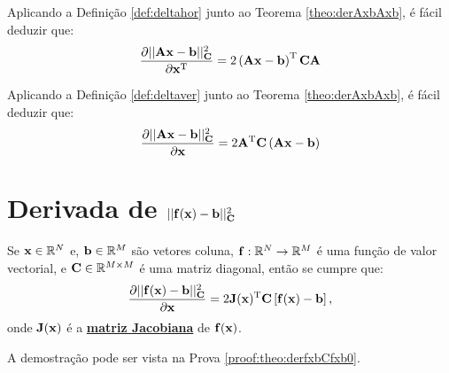 \begin{corollaryT}\label{coro:derAxbAxb1}
Aplicando a Definição \ref{def:deltahor} junto ao Teorema \ref{theo:derAxbAxb}, é
fácil deduzir que:
\begin{equation}
\frac{\partial ||\MATRIX{A}\VECTOR{x}-\VECTOR{b}||_{\MATRIX{C}}^2}{\partial \VECTOR{x}^{\transpose}}=
2\left(\MATRIX{A}\VECTOR{x}- \VECTOR{b} \right)^{\transpose}\MATRIX{C}\MATRIX{A}
\end{equation}
\end{corollaryT}

\begin{corollaryT}\label{coro:derAxbAxb2}
Aplicando a Definição \ref{def:deltaver} junto ao Teorema \ref{theo:derAxbAxb}, é
fácil deduzir que:
\begin{equation}
\frac{\partial ||\MATRIX{A}\VECTOR{x}-\VECTOR{b}||_{\MATRIX{C}}^2}{\partial \VECTOR{x} }=
2 \MATRIX{A}^{\transpose}\MATRIX{C}\left(\MATRIX{A}\VECTOR{x}-\VECTOR{b}\right)
\end{equation}
\end{corollaryT}

\section{Derivada de $||\VECTOR{f}(\VECTOR{x})-\VECTOR{b}||_{\MATRIX{C}}^2$  
}

\begin{theorem}\label{theo:derfxbCfxb0}
Se 
$\VECTOR{x}\in \mathbb{R}^N$ e, 
$\VECTOR{b}\in \mathbb{R}^M$ são vetores coluna,  
$\VECTOR{f}: \mathbb{R}^{N}\rightarrow \mathbb{R}^{M}$ é uma função de valor vectorial, e
$\MATRIX{C} \in \mathbb{R}^{M\times M}$ é uma matriz diagonal, 
então se cumpre que:
\begin{equation}
\frac{\partial ||\VECTOR{f}(\VECTOR{x})-\VECTOR{b}||_{\MATRIX{C}}^2}{\partial \VECTOR{x}} =
2 \MATRIX{J}(\VECTOR{x})^{\transpose}\MATRIX{C}\left[\VECTOR{f}(\VECTOR{x})-\VECTOR{b}\right],
\end{equation}
onde $\MATRIX{J}(\VECTOR{x})$ é a \hyperref[def:jacobian]{\textbf{matriz Jacobiana}} de $\VECTOR{f}(\VECTOR{x})$.

A demostração pode ser vista na Prova \ref{proof:theo:derfxbCfxb0}.
\end{theorem}

